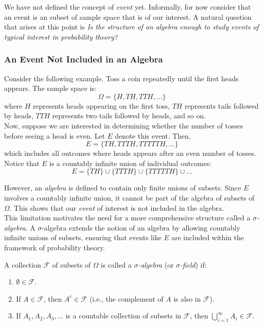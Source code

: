 We have not defined the concept of \textit{event} yet. Informally, for now consider that an event is an subset of sample space that is of our interest. A natural question that arises at this point is \textit{Is the structure of an algebra enough to study events of typical interest in probability theory?} 

\subsubsection{An Event Not Included in an Algebra}

Consider the following example. Toss a coin repeatedly until the first heads appears. The sample space is:
\[
\Omega = \{H, TH, TTH, \ldots\}
\]
where $H$ represents heads appearing on the first toss, $TH$ represents tails followed by heads, $TTH$ represents two tails followed by heads, and so on. \\

Now, suppose we are interested in determining whether the number of tosses before seeing a head is even. Let $E$ denote this event. Then,
\[
E = \{TH, TTTH, TTTTTH, \ldots\}
\]
which includes all outcomes where heads appears after an even number of tosses. \\

Notice that $E$ is a countably infinite union of individual outcomes:
\[
E = \{TH\} \cup \{TTTH\} \cup \{TTTTTH\} \cup \ldots
\]

However, an \textit{algebra} is defined to contain only finite unions of subsets. Since $E$ involves a countably infinite union, it cannot be part of the algebra of subsets of $\Omega$. This shows that our \textit{event} of interest is not included in the algebra. \\

This limitation motivates the need for a more comprehensive structure called a \textit{$\sigma$-algebra}. A $\sigma$-algebra extends the notion of an algebra by allowing countably infinite unions of subsets, ensuring that events like $E$ are included within the framework of probability theory.


\begin{definition}
    A collection $\mathcal{F}$ of subsets of $\Omega$ is called a \textit{$\sigma$-algebra} (or \textit{$\sigma$-field}) if:

\begin{enumerate}
    \item $\emptyset \in \mathcal{F}$.
    \item If $A \in \mathcal{F}$, then $A^c \in \mathcal{F}$ (i.e., the complement of $A$ is also in $\mathcal{F}$).
    \item If $A_1, A_2, A_3, \ldots$ is a countable collection of subsets in $\mathcal{F}$, then $\bigcup\limits_{i=1}^{\infty} A_i \in \mathcal{F}$.
\end{enumerate}
\end{definition}


